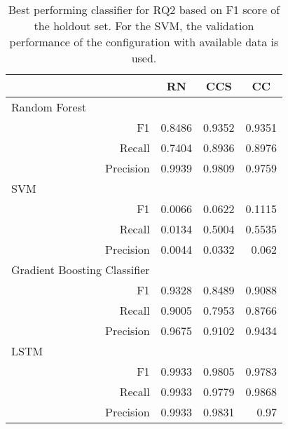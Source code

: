 \begin{table}[ht]
    \centering
    \begin{tabular}{rrrr}
    \toprule
    \multicolumn{1}{l}{}                             & \multicolumn{1}{c}{RN}         & \multicolumn{1}{c}{CCS} & \multicolumn{1}{c}{CC} \\ \midrule
    \multicolumn{1}{l}{Random Forest}                &  &            &              \\
    F1                                               & 0.8486               & 0.9352     & 0.9351       \\
    Recall                                           & 0.7404               & 0.8936     & 0.8976       \\
    Precision                                        & 0.9939               & 0.9809     & 0.9759       \\ \midrule
    \multicolumn{1}{l}{SVM}                          &                      &            &              \\
    F1                                               &   0.0066             &  0.0622    &   0.1115     \\
    Recall                                           &   0.0134             &  0.5004    &   0.5535     \\
    Precision                                        &   0.0044             &  0.0332    &   0.062      \\ \midrule
    \multicolumn{1}{l}{Gradient Boosting Classifier} &                      &            &              \\
    F1                                               & 0.9328               & 0.8489     & 0.9088       \\
    Recall                                           & 0.9005               & 0.7953     & 0.8766       \\
    Precision                                        & 0.9675               & 0.9102     & 0.9434       \\ \midrule
    \multicolumn{1}{l}{LSTM}                         &                      &            &              \\
    F1                                               & 0.9933               & 0.9805     & 0.9783       \\
    Recall                                           & 0.9933               & 0.9779     & 0.9868       \\
    Precision                                        & 0.9933               & 0.9831     & 0.97       \\ \bottomrule
    \end{tabular}
    \caption[Best performing classifier for RQ2]{Best performing classifier for RQ2 based on F1 score of the holdout set. For the SVM, the validation performance of the configuration with available data is used.}
    \label{tab:rq2_best_classifier}
    \end{table}